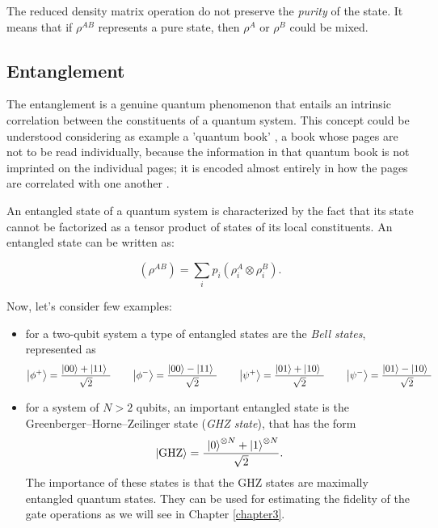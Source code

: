\noindent The reduced density matrix operation do not preserve the \textit{purity} of the state. It means that if $\rho^{AB}$ represents a pure state, then $\rho^A$ or $\rho^B$ could be mixed.




\subsection{Entanglement} 
\label{Concurrence_theory}
The entanglement is a genuine quantum phenomenon that entails an intrinsic correlation between the constituents of a quantum system.
This concept could be understood considering as example a 'quantum book' \cite{PreskillNote},  a book whose pages are not to be read individually, because the information in that quantum book is not imprinted on the individual pages; it is encoded almost entirely in how the pages are correlated with one another . 

An entangled state of a quantum system is characterized by the fact that its state cannot be factorized as a tensor product of states of its local constituents. An entangled state can be written as:

\begin{equation}
(\rho^{AB}) = \sum_i p_i (\rho_i^A \otimes \rho_i^B).
 \label{13_firstchapter}
\end{equation}

\noindent
Now, let's consider few examples:

\begin{itemize}
\item  for a two-qubit system a type of entangled states are the \textit{Bell states}, represented as
\begin{equation}
\ket{\phi^+} = \frac{ \ket{00}+\ket{11} }{\sqrt{2}} \qquad \ket{\phi^-} = \frac{ \ket{00}-\ket{11} }{\sqrt{2}} \qquad \ket{\psi^+} = \frac{ \ket{01}+\ket{10} }{\sqrt{2}} \qquad \ket{\psi^-} = \frac{ \ket{01}-\ket{10} }{\sqrt{2}}
 \label{14_firstchapter}
\end{equation}

\item for a system of $N > 2$ qubits, an important entangled state is the Greenberger–Horne–Zeilinger state (\textit{GHZ state}), that has the form
\begin{equation}
\left| \text{GHZ} \right \rangle= \frac{\, \, \left| 0 \right \rangle^{\otimes N} + \left| 1 \right \rangle^{\otimes N} }{\sqrt{2} }.
 \label{15_firstchapter}
\end{equation}
\noindent The importance of these states is that the GHZ states are maximally entangled quantum states. They can be used for estimating the fidelity of the gate operations as we will see in Chapter \ref{chapter3}.
\end{itemize}




